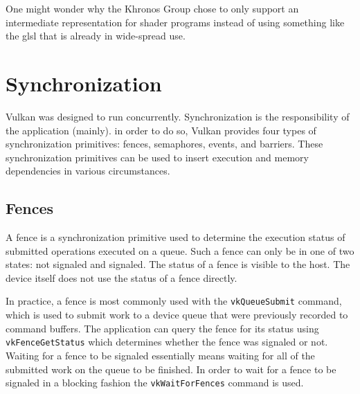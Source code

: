 
    One might wonder why the Khronos Group chose to only support an intermediate representation for shader programs instead of using something like the \acrfull{glsl} that is already in wide-spread use. 

  \section{Synchronization}

    Vulkan was designed to run concurrently. Synchronization is the responsibility of the application (mainly). in order to do so, Vulkan provides four types of synchronization primitives: fences, semaphores, events, and barriers. These synchronization primitives can be used to insert execution and memory dependencies in various circumstances.


    \subsection{Fences}
    \label{sub:Fences}
      A fence is a synchronization primitive used to determine the execution status of submitted operations executed on a queue. Such a fence can only be in one of two states: not signaled and signaled. The status of a fence is visible to the host. The device itself does not use the status of a fence directly.

      In practice, a fence is most commonly used with the \lstinline{vkQueueSubmit} command, which is used to submit work to a device queue that were previously recorded to command buffers. The application can query the fence for its status using \lstinline{vkFenceGetStatus} which determines whether the fence was signaled or not. Waiting for a fence to be signaled essentially means waiting for all of the submitted work on the queue to be finished. In order to wait for a fence to be signaled in a blocking fashion the \lstinline{vkWaitForFences} command is used.

